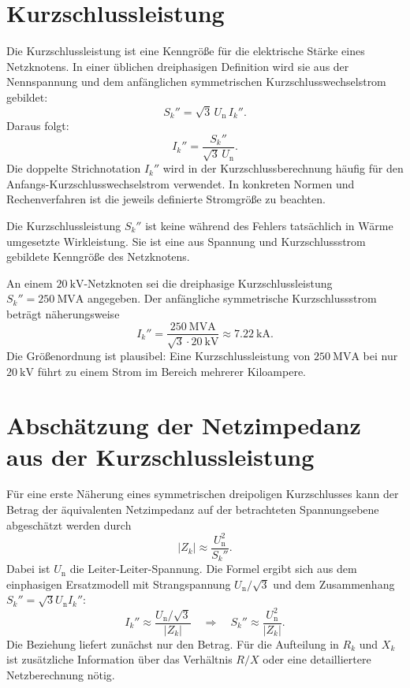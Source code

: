 \section{Kurzschlussleistung}

Die Kurzschlussleistung ist eine Kenngröße für die elektrische Stärke eines
Netzknotens. In einer üblichen dreiphasigen Definition wird sie aus der
Nennspannung und dem anfänglichen symmetrischen Kurzschlusswechselstrom
gebildet:
\begin{equation}
  S_k''=\sqrt{3}\,U_\mathrm{n}\,I_k''.
  \label{eq:sk_definition}
\end{equation}
Daraus folgt:
\begin{equation}
  I_k''=\frac{S_k''}{\sqrt{3}\,U_\mathrm{n}}.
  \label{eq:ik_from_sk}
\end{equation}
Die doppelte Strichnotation \(I_k''\) wird in der Kurzschlussberechnung
häufig für den Anfangs-Kurzschlusswechselstrom verwendet. In konkreten
Normen und Rechenverfahren ist die jeweils definierte Stromgröße zu beachten.

\begin{merke}
Die Kurzschlussleistung \(S_k''\) ist keine während des Fehlers tatsächlich
in Wärme umgesetzte Wirkleistung. Sie ist eine aus Spannung und
Kurzschlussstrom gebildete Kenngröße des Netzknotens.
\end{merke}

\begin{rechenbeispiel}
An einem \(\SI{20}{\kilo\volt}\)-Netzknoten sei die dreiphasige
Kurzschlussleistung \(S_k''=\SI{250}{\mega\volt\ampere}\) angegeben.
Der anfängliche symmetrische Kurzschlussstrom beträgt näherungsweise
\[
I_k''=\frac{\SI{250}{\mega\volt\ampere}}
{\sqrt{3}\cdot\SI{20}{\kilo\volt}}
\approx \SI{7.22}{\kilo\ampere}.
\]
Die Größenordnung ist plausibel: Eine Kurzschlussleistung von
\(\SI{250}{\mega\volt\ampere}\) bei nur \(\SI{20}{\kilo\volt}\) führt zu
einem Strom im Bereich mehrerer Kiloampere.
\end{rechenbeispiel}

\section{Abschätzung der Netzimpedanz aus der Kurzschlussleistung}

Für eine erste Näherung eines symmetrischen dreipoligen Kurzschlusses kann
der Betrag der äquivalenten Netzimpedanz auf der betrachteten Spannungsebene
abgeschätzt werden durch
\begin{equation}
  |Z_k|\approx\frac{U_\mathrm{n}^2}{S_k''}.
  \label{eq:zk_from_sk}
\end{equation}
Dabei ist \(U_\mathrm{n}\) die Leiter-Leiter-Spannung. Die Formel ergibt sich
aus dem einphasigen Ersatzmodell mit Strangspannung \(U_\mathrm{n}/\sqrt{3}\)
und dem Zusammenhang \(S_k''=\sqrt{3}U_\mathrm{n}I_k''\):
\[
I_k''\approx\frac{U_\mathrm{n}/\sqrt{3}}{|Z_k|}
\quad\Longrightarrow\quad
S_k''\approx\frac{U_\mathrm{n}^2}{|Z_k|}.
\]
Die Beziehung liefert zunächst nur den Betrag. Für die Aufteilung in
\(R_k\) und \(X_k\) ist zusätzliche Information über das Verhältnis \(R/X\)
oder eine detailliertere Netzberechnung nötig.

